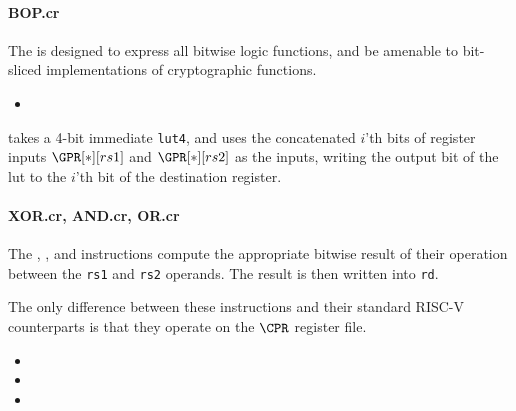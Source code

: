 \paragraph{BOP.cr}

The  is designed to express all bitwise logic functions, and be
amenable to bit-sliced implementations of cryptographic functions.

\begin{itemize}
\item {}
\end{itemize}

 takes a 4-bit immediate {\tt lut4}, and uses the concatenated
$i$'th bits of register inputs $\GPR[*][rs1]$ and  $\GPR[*][rs2]$
as the inputs, writing the output bit of the lut to the $i$'th bit of the
destination register.

\paragraph{XOR.cr, AND.cr, OR.cr}

The , , and  instructions compute the
appropriate bitwise result of their operation between the {\tt rs1} and
{\tt rs2} operands. The result is then written into {\tt rd}.


The only difference between these instructions and their standard RISC-V
counterparts is that they operate on the $\CPR$ register file.

\begin{itemize}
\item {}
\item {}
\item {}
\end{itemize}

